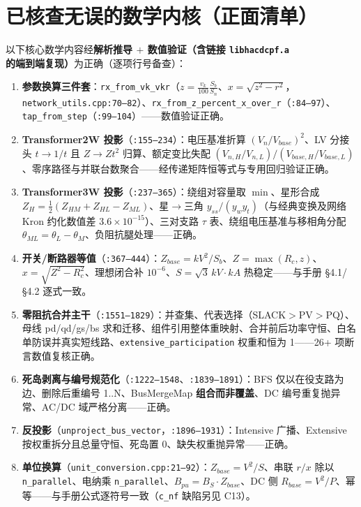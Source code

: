 \documentclass[11pt,a4paper,fontset=fandol]{ctexart}
\newcommand{\file}[1]{\texttt{#1}}
\begin{document}
\newpage
\section{已核查无误的数学内核（正面清单）}
\label{sec:verified}

以下核心数学内容经\textbf{解析推导 $+$ 数值验证（含链接 \file{libhacdcpf.a} 的端到端复现）}为正确（逐项行号备查）：

\begin{enumerate}
  \item \textbf{参数换算三件套}：\file{rx\_from\_vk\_vkr}（$z=\frac{v_k}{100}\frac{S_b}{S_n}$、$x=\sqrt{z^2-r^2}$，\file{network\_utils.cpp:70--82}）、\file{rx\_from\_z\_percent\_x\_over\_r}（\file{:84--97}）、\file{tap\_from\_step}（\file{:99--104}）——数值验证正确。
  \item \textbf{Transformer2W 投影}（\file{:155--234}）：电压基准折算 $(V_n/V_{base})^2$、LV 分接头 $t\to 1/t$ 且 $Z\to Zt^2$ 归算、额定变比失配 $(V_{n,H}/V_{n,L})/(V_{base,H}/V_{base,L})$、零序路径与并联台数聚合——经传递矩阵恒等式与专用回归验证正确。
  \item \textbf{Transformer3W 投影}（\file{:237--365}）：绕组对容量取 $\min$、星形合成 $Z_H=\frac{1}{2}(Z_{HM}+Z_{HL}-Z_{ML})$、星$\to$三角 $y_{ss}/(y_w y_t)$（与经典变换及网络 Kron 约化数值差 $3.6\times10^{-15}$）、三对支路 $\tau$ 表、绕组电压基准与移相角分配 $\theta_{ML}=\theta_L-\theta_M$、负阻抗腿处理——正确。
  \item \textbf{开关/断路器等值}（\file{:367--444}）：$Z_{base}=kV^2/S_b$、$Z=\max(R_c,z)$、$x=\sqrt{Z^2-R_c^2}$、理想闭合补 $10^{-6}$、$S=\sqrt{3}\,kV\cdot kA$ 热稳定——与手册 \S 4.1/\S 4.2 逐式一致。
  \item \textbf{零阻抗合并主干}（\file{:1551--1829}）：并查集、代表选择（SLACK$>$PV$>$PQ）、母线 pd/qd/gs/bs 求和迁移、组件引用整体重映射、合并前后功率守恒、白名单防误并真实短线路、\texttt{extensive\_participation} 权重和恒为 1——26+ 项断言数值复核正确。
  \item \textbf{死岛剥离与编号规范化}（\file{:1222--1548}、\file{:1839--1891}）：BFS 仅以在役支路为边、删除后重编号 1..N、BusMergeMap \textbf{组合而非覆盖}、DC 编号重复抛异常、AC/DC 域严格分离——正确。
  \item \textbf{反投影}（\file{unproject\_bus\_vector}，\file{:1896--1931}）：Intensive 广播、Extensive 按权重拆分且总量守恒、死岛置 0、缺失权重抛异常——正确。
  \item \textbf{单位换算}（\file{unit\_conversion.cpp:21--92}）：$Z_{base}=V^2/S$、串联 $r/x$ 除以 \texttt{n\_parallel}、电纳乘 \texttt{n\_parallel}、$B_{pu}=B_{S}\cdot Z_{base}$、DC 侧 $R_{base}=V^2/P$、幂等——与手册公式逐符号一致（\texttt{c\_nf} 缺陷另见 C13）。

\end{enumerate}
\end{document}
